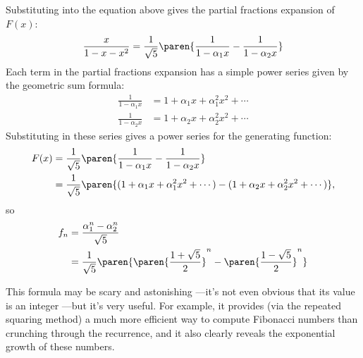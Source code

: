 Substituting into the equation above gives the partial fractions
expansion of $F(x)$:
%
\[
\frac{x}{1 - x - x^2} =
        \frac{1}{\sqrt{5}}
        \paren{\frac{1}{1 - \alpha_1 x} - \frac{1}{1 - \alpha_2 x}}
\]
%
Each term in the partial fractions expansion has a simple power series
given by the geometric sum formula:
%
\begin{align*}
\frac{1}{1 - \alpha_1 x} & = 1 + \alpha_1 x + \alpha_1^2 x^2 + \cdots \\
\frac{1}{1 - \alpha_2 x} & = 1 + \alpha_2 x + \alpha_2^2 x^2 + \cdots
\end{align*}
%
Substituting in these series gives a power series for the generating
function:
%
\begin{align*}
F(x) & =
  \frac{1}{\sqrt{5}}
  \paren{\frac{1}{1 - \alpha_1 x} -
        \frac{1}{1 - \alpha_2 x}}\\
    & = \frac{1}{\sqrt{5}}
        \paren{(1 + \alpha_1 x + \alpha_1^2 x^2 + \cdots) -
        (1 + \alpha_2 x + \alpha_2^2 x^2 + \cdots)},
\end{align*}
so
\begin{align*}
 f_n & = \frac{\alpha_1^n - \alpha_2^n}{\sqrt{5}} \\
                & = \frac{1}{\sqrt{5}}
        \paren{
         \paren{\frac{1 + \sqrt{5}}{2}}^n -
         \paren{\frac{1 - \sqrt{5}}{2}}^n}
\end{align*}

This formula may be scary and astonishing ---it's not even obvious that
its value is an integer ---but it's very useful.  For example, it provides
(via the repeated squaring method) a much more efficient way to compute
Fibonacci numbers than crunching through the recurrence, and it also
clearly reveals the exponential growth of these numbers.

\begin{problems}
\classproblems
{}

\homeworkproblems
{}

\examproblems
{}

\end{problems}


